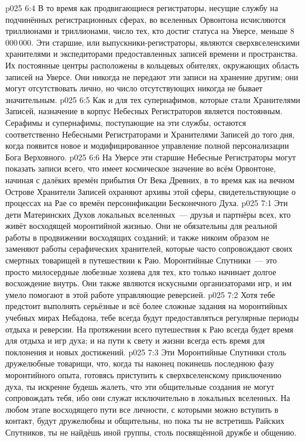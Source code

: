 \vs p025 6:4 В то время как продвигающиеся регистраторы, несущие службу на подчинённых регистрационных сферах, во вселенных Орвонтона исчисляются триллионами и триллионами, число тех, кто достиг статуса на Уверсе, меньше 8\,000\,000. Эти старшие, или выпускники\hyp{}регистраторы, являются сверхвселенскими хранителями и экспедиторами предоставленных записей времени и пространства. Их постоянные центры расположены в кольцевых обителях, окружающих область записей на Уверсе. Они никогда не передают эти записи на хранение другим; они могут отсутствовать лично, но число отсутствующих никогда не бывает значительным.
\vs p025 6:5 Как и для тех супернафимов, которые стали Хранителями Записей, назначение в корпус Небесных Регистраторов является постоянным. Серафимы и супернафимы, поступающие на эти службы, остаются соответственно Небесными Регистраторами и Хранителями Записей до того дня, когда появится новое и модифицированное управление полной персонализации Бога Верховного.
\vs p025 6:6 На Уверсе эти старшие Небесные Регистраторы могут показать записи всего, что имеет космическое значение во всём Орвонтоне, начиная с далёких времён прибытия От Века Древних, в то время как на вечном Острове Хранители Записей охраняют архивы этой сферы, свидетельствующие о процессах на Рае со времён персонификации Бесконечного Духа.
\vs p025 7:1 Эти дети Материнских Духов локальных вселенных~--- друзья и партнёры всех, кто живёт восходящей моронтийной жизнью. Они не обязательны для реальной работы в продвижении восходящих созданий; и также никоим образом не заменяют работы серафических хранителей, которые часто сопровождают своих смертных товарищей в путешествии к Раю. Моронтийные Спутники~--- это просто милосердные любезные хозяева для тех, кто только начинает долгое восхождение внутрь. Они также являются искусными организаторами игр, и им умело помогают в этой работе управляющие реверсией.
\vs p025 7:2 Хотя тебе предстоит выполнять серьёзные и всё более сложные задания на моронтийных учебных мирах Небадона, тебе всегда будут предоставляться регулярные периоды отдыха и реверсии. На протяжении всего путешествия к Раю всегда будет время для отдыха и игр духа; и на пути к свету и жизни всегда есть время для поклонения и новых достижений.
\vs p025 7:3 Эти Моронтийные Спутники столь дружелюбные товарищи, что, когда ты наконец покинешь последнюю фазу моронтийного опыта, готовясь приступить к сверхвселенскому приключению духа, ты искренне будешь жалеть, что эти общительные создания не могут сопровождать тебя, ибо они служат исключительно в локальных вселенных. На любом этапе восходящего пути все личности, с которыми можно вступить в контакт, будут дружелюбны и общительны, но пока ты не встретишь Райских Спутников, ты не найдёшь иной группы, столь посвящённой дружбе и общению.
